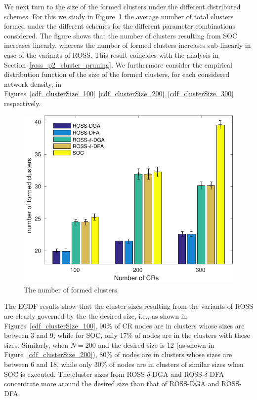 \documentclass[times]{ettauth}
\newcommand{\ie}{i.e., }
\theoremstyle{mytheoremstyle}
\theoremstyle{mytheoremstyle}
\theoremstyle{mytheoremstyle}
\begin{document}
We next turn to the size of the formed clusters under the different distributed schemes.
For this we study in Figure~\ref{nClusters_largeNetwork} the average number of total clusters formed under the different schemes for the different parameter combinations considered.
The figure shows that the number of clusters resulting from SOC increases linearly, whereas the number of formed clusters increases sub-linearly in case of the variants of ROSS.
This result coincides with the analysis in Section~\ref{ross_p2_cluster_pruning}.
We furthermore consider the empirical distribution function of the size of the formed clusters, for each considered network density, in Figures~\ref{cdf_clusterSize_100}~\ref{cdf_clusterSize_200}~\ref{cdf_clusterSize_300} respectively.
\begin{figure}[!h]
  \centering
   \includegraphics[width=0.7\linewidth]{nClusters_largeNetwork_no_texture.pdf}
  \caption{The number of formed clusters.}
  \label{nClusters_largeNetwork}
\end{figure}

The ECDF results show that the cluster sizes resulting from the variants of ROSS are clearly governed by the the desired size, \ie as shown in Figures~\ref{cdf_clusterSize_100}, 90\% of CR nodes are in clusters whose sizes are between 3 and 9, while for SOC, only 17\% of nodes are in the clusters with these sizes.
Similarly, when $N=200$ and the desired size is 12 (as shown in Figure~\ref{cdf_clusterSize_200}), 80\% of nodes are in clusters whose sizes are between 6 and 18, while only 30\% of nodes are in clusters of similar sizes when SOC is executed.
The cluster sizes from ROSS-$\delta$-DGA and ROSS-$\delta$-DFA concentrate more around the desired size than that of ROSS-DGA and ROSS-DFA.
\end{document}
